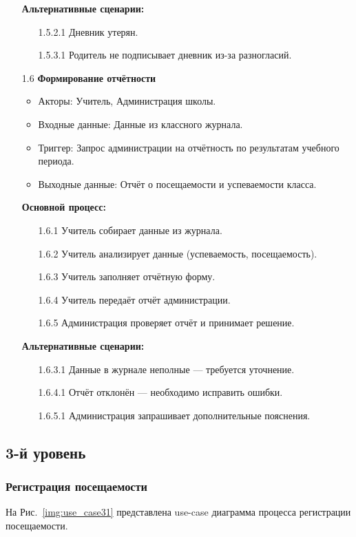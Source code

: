\documentclass[a4paper, final]{article}
\begin{document}
\begin{enumerate}
  \textbf{Альтернативные сценарии:}
  \begin{itemize}
    \item[1.5.2.1] Дневник утерян.
    \item[1.5.3.1] Родитель не подписывает дневник из-за разногласий. 
  \end{itemize}
  

  \item[1.6] \textbf{Формирование отчётности}
  \begin{itemize}
    \item Акторы: Учитель, Администрация школы.
    \item Входные данные: Данные из классного журнала.
    \item Триггер: Запрос администрации на отчётность по результатам учебного периода.
    \item Выходные данные: Отчёт о посещаемости и успеваемости класса.
  \end{itemize}

  \textbf{Основной процесс:}
  \begin{enumerate}
    \item[1.6.1] Учитель собирает данные из журнала.
    \item[1.6.2] Учитель анализирует данные (успеваемость, посещаемость).
    \item[1.6.3] Учитель заполняет отчётную форму.
    \item[1.6.4] Учитель передаёт отчёт администрации.
    \item[1.6.5] Администрация проверяет отчёт и принимает решение.
  \end{enumerate}

  \textbf{Альтернативные сценарии:}
  \begin{itemize}
    \item[1.6.3.1] Данные в журнале неполные --- требуется уточнение.
    \item[1.6.4.1] Отчёт отклонён --- необходимо исправить ошибки.
    \item[1.6.5.1] Администрация запрашивает дополнительные пояснения.
  \end{itemize}
\end{enumerate}


\subsection{3-й уровень}
\subsubsection{Регистрация посещаемости}
На Рис.~\ref{img:use_case31} представлена use-case диаграмма процесса регистрации посещаемости.
\end{document}
